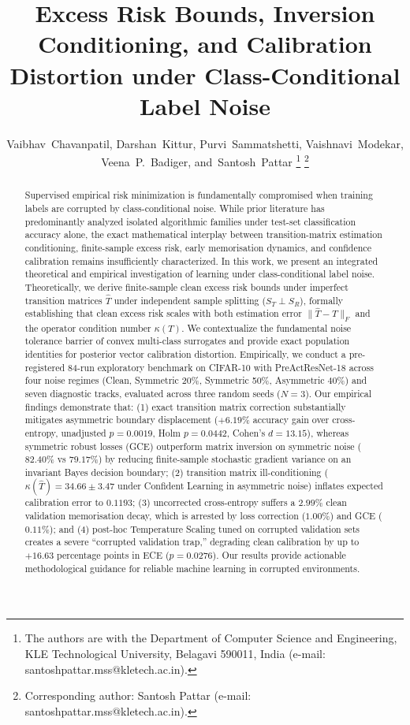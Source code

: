 \documentclass[journal]{IEEEtran}
\theoremstyle{definition}
\begin{document}
\title{Excess Risk Bounds, Inversion Conditioning, and Calibration Distortion under Class-Conditional Label Noise}

\author{Vaibhav~Chavanpatil,
        Darshan~Kittur,
        Purvi~Sammatshetti,
        Vaishnavi~Modekar,
        Veena~P.~Badiger,
        and~Santosh~Pattar%
\thanks{The authors are with the Department of Computer Science and Engineering, KLE Technological University, Belagavi 590011, India (e-mail: santoshpattar.mss@kletech.ac.in).}%
\thanks{Corresponding author: Santosh Pattar (e-mail: santoshpattar.mss@kletech.ac.in).}}

\maketitle

\begin{abstract}
Supervised empirical risk minimization is fundamentally compromised when training labels are corrupted by class-conditional noise. While prior literature has predominantly analyzed isolated algorithmic families under test-set classification accuracy alone, the exact mathematical interplay between transition-matrix estimation conditioning, finite-sample excess risk, early memorisation dynamics, and confidence calibration remains insufficiently characterized. In this work, we present an integrated theoretical and empirical investigation of learning under class-conditional label noise. Theoretically, we derive finite-sample clean excess risk bounds under imperfect transition matrices $\hat{T}$ under independent sample splitting ($S_T \perp S_R$), formally establishing that clean excess risk scales with both estimation error $\|\hat{T} - T\|_F$ and the operator condition number $\kappa(T)$. We contextualize the fundamental noise tolerance barrier of convex multi-class surrogates and provide exact population identities for posterior vector calibration distortion. Empirically, we conduct a pre-registered 84-run exploratory benchmark on CIFAR-10 with PreActResNet-18 across four noise regimes (Clean, Symmetric 20\%, Symmetric 50\%, Asymmetric 40\%) and seven diagnostic tracks, evaluated across three random seeds ($N=3$). Our empirical findings demonstrate that: (1) exact transition matrix correction substantially mitigates asymmetric boundary displacement ($+6.19\%$ accuracy gain over cross-entropy, unadjusted $p = 0.0019$, Holm $p = 0.0442$, Cohen's $d = 13.15$), whereas symmetric robust losses (GCE) outperform matrix inversion on symmetric noise ($82.40\%$ vs $79.17\%$) by reducing finite-sample stochastic gradient variance on an invariant Bayes decision boundary; (2) transition matrix ill-conditioning ($\kappa(\hat{T}) = 34.66 \pm 3.47$ under Confident Learning in asymmetric noise) inflates expected calibration error to $0.1193$; (3) uncorrected cross-entropy suffers a $2.99\%$ clean validation memorisation decay, which is arrested by loss correction ($1.00\%$) and GCE ($0.11\%$); and (4) post-hoc Temperature Scaling tuned on corrupted validation sets creates a severe ``corrupted validation trap,'' degrading clean calibration by up to $+16.63$ percentage points in ECE ($p = 0.0276$). Our results provide actionable methodological guidance for reliable machine learning in corrupted environments.

\end{abstract}
\end{document}
